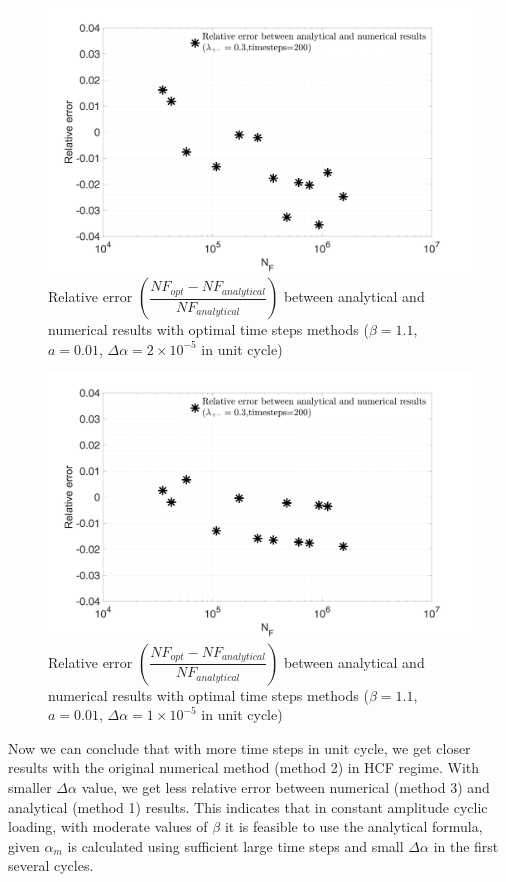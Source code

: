 \begin{figure}[!h]
	\centering
	\includegraphics[width=\textwidth]{figures//SN_opt_ana_200_delta_alp=0.00002_err.png} 
	\caption{Relative error $\left( \dfrac{NF_{opt}-NF_{analytical}}{NF_{analytical}}\right)$  between analytical and numerical results with optimal time steps methods ($\beta=1.1$, $a=0.01$, $\Delta \alpha=2\times10^{-5}$ in unit cycle)}	
	\label{fig.errorNumAna0.02}
\end{figure}
\begin{figure}[!h]
	\centering
	\includegraphics[width=\textwidth]{figures//SN_opt_ana_200_delta_alp=0.00001_err.png} 
	\caption{Relative error $\left(\dfrac{NF_{opt}-NF_{analytical}}{NF_{analytical}}\right)$  between analytical and numerical results with optimal time steps methods ($\beta=1.1$, $a=0.01$, $\Delta \alpha=1\times10^{-5}$ in unit cycle)}
	\label{fig.errorNumAna0.01}
\end{figure}

Now we can conclude that with more time steps in unit cycle, we get closer results with the original numerical method (method 2) in HCF regime. With smaller $\Delta \alpha$ value, we get less relative error between numerical (method 3) and analytical (method 1) results. This indicates that in constant amplitude cyclic loading, with moderate values of $\beta$ it is feasible to use the analytical formula, given $\alpha_m$ is calculated using sufficient large time steps and small $\Delta \alpha$ in the first several cycles.

